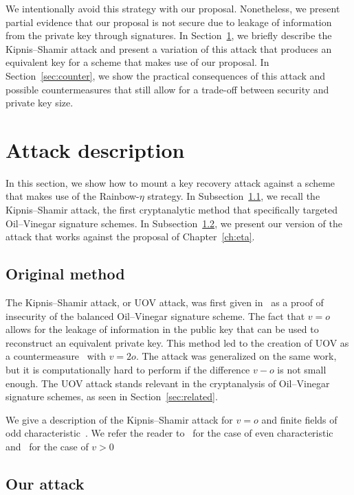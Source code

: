 \documentclass[12pt, a4paper, oneside]{memoir}
\theoremstyle{definition}
\begin{document}
We intentionally avoid this strategy with our proposal. Nonetheless, we present partial evidence that our proposal is not secure due to leakage of information from the private key through signatures. In Section~\ref{sec:atdesc}, we briefly describe the Kipnis--Shamir attack and present a variation of this attack that produces an equivalent key for a scheme that makes use of our proposal. In Section~\ref{sec:counter}, we show the practical consequences of this attack and possible countermeasures that still allow for a trade-off between security and private key size.

\section{Attack description}\label{sec:atdesc}

In this section, we show how to mount a key recovery attack against a scheme that makes use of the Rainbow-$\eta$ strategy. In Subsection~\ref{subsec:ks}, we recall the Kipnis--Shamir attack, the first cryptanalytic method that specifically targeted Oil--Vinegar signature schemes. In Subsection~\ref{subsec:etaks}, we present our version of the attack that works against the proposal of Chapter~\ref{ch:eta}.

\subsection{Original method}\label{subsec:ks}

The Kipnis--Shamir attack, or UOV attack, was first given in~\cite{Kipnis:199808} as a proof of insecurity of the balanced Oil--Vinegar signature scheme. The fact that $v = o$ allows for the leakage of information in the public key that can be used to reconstruct an equivalent private key. This method led to the creation of UOV as a countermeasure~\cite{Kipnis:199904} with $v = 2o$. The attack was generalized on the same work, but it is computationally hard to perform if the difference $v - o$ is not small enough. The UOV attack stands relevant in the cryptanalysis of Oil--Vinegar signature schemes, as seen in Section~\ref{sec:related}. 

We give a description of the Kipnis--Shamir attack for $v = o$ and finite fields of odd characteristic~\cite[Section 3.2]{Ding:2006}. We refer the reader to~\cite{Cao:201105} for the case of even characteristic and~\cite{Kipnis:199904} for the case of $v > 0$

\subsection{Our attack}\label{subsec:etaks}
\end{document}
